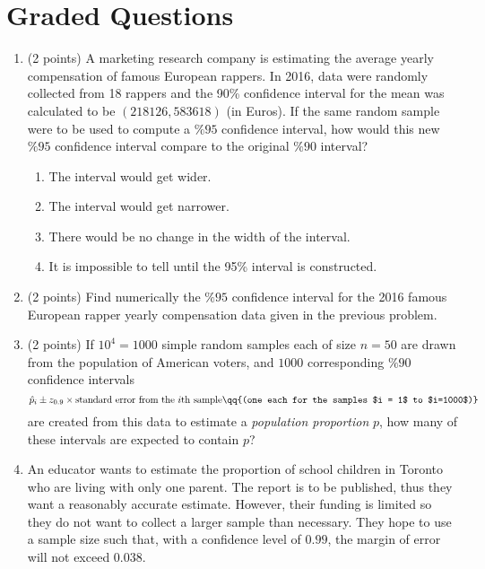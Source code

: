 \documentclass{ccg-topic}
\begin{document}
\section*{Graded Questions}
\begin{enumerate}
\item (2 points) A marketing research company is estimating the average yearly compensation of famous European rappers. In 2016, data were randomly collected from 18 rappers and the 90\% confidence interval for the mean was calculated to be $(218126, 583618)$ (in Euros). If the same random sample were to be used to compute a  $\%95$ confidence interval, how would this new $\%95$ confidence interval compare to the original $\%90$ interval?

\begin{enumerate}
\item The interval would get wider.
\item The interval would get narrower.
\item There would be no change in the width of the interval.
\item It is impossible to tell until the 95\% interval is constructed.
\end{enumerate}
     

\vfill

\item (2 points) Find numerically the $\%95$ confidence interval for the 2016 famous European rapper yearly compensation data given in the previous problem.


\vfill
    
\item (2 points) If $10^4 = 1000$ simple random samples each of size $n=50$ are drawn from the population of American voters, and $1000$ corresponding $\%90$ confidence intervals 
\[
    \hat{p}_i \pm z_{0.9} \times \text{standard error from the $i$th sample} \qq{(one each for the samples $i = 1$ to $i=1000$)}
\]
are created from this data to estimate a \emph{population proportion} $p$, how many of these intervals are expected to contain $p$?
    
\vfill
\newpage

\item An educator wants to estimate the proportion of school children in Toronto who are living with only one parent. The report is to be published, thus they want a reasonably accurate estimate. However, their funding is limited so they do not want to collect a larger sample than necessary. They hope to use a sample size such that, with a confidence level of $0.99$, the margin of error will not exceed $0.038$. 


\end{enumerate}
\end{document}
